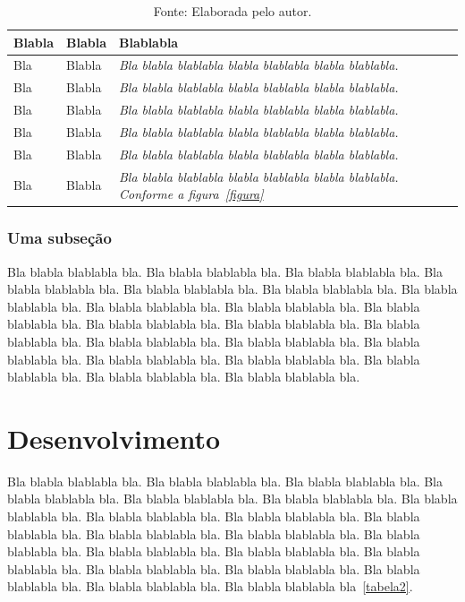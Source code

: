 \documentclass[diss,capa]{texufpel}
\begin{document}
\begin{table}
\caption{Nome da Tabela}\label{tabela}
\centering\begin{tabular}{p{4cm}p{5cm}p{6cm}}
\hline
Blabla & Blabla & Blablabla\\
\hline
{\small Bla} & {\small Blabla} & {\small\em Bla blabla blablabla blabla
  blablabla blabla blablabla.}\\
{\small Bla} & {\small Blabla} & {\small\em Bla blabla blablabla blabla
  blablabla blabla blablabla.}\\
{\small Bla} & {\small Blabla} & {\small\em Bla blabla blablabla blabla
  blablabla blabla blablabla.}\\
{\small Bla} & {\small Blabla} & {\small\em Bla blabla blablabla blabla
  blablabla blabla blablabla.}\\
{\small Bla} & {\small Blabla} & {\small\em Bla blabla blablabla blabla
  blablabla blabla blablabla.}\\
{\small Bla} & {\small Blabla} & {\small\em Bla blabla blablabla blabla
  blablabla blabla blablabla. Conforme a figura~\ref{figura}}\\
\hline
\end{tabular}
\caption*{Fonte: Elaborada pelo autor.}    
\end{table}


\subsection{Uma subseção}

Bla blabla blablabla bla.  Bla blabla blablabla bla.  Bla blabla
blablabla bla.  Bla blabla blablabla bla.  Bla blabla blablabla bla.
Bla blabla blablabla bla.  Bla blabla blablabla bla.  Bla blabla
blablabla bla.  Bla blabla blablabla bla.  Bla blabla blablabla bla.
Bla blabla blablabla bla.  Bla blabla blablabla bla.  Bla blabla
blablabla bla.  Bla blabla blablabla bla.  Bla blabla blablabla bla.
Bla blabla blablabla bla.  Bla blabla blablabla bla.  Bla blabla
blablabla bla.  Bla blabla blablabla bla.  Bla blabla blablabla bla.
Bla blabla blablabla bla.

\chapter{Desenvolvimento}

  Bla blabla blablabla bla.  Bla blabla blablabla bla.  Bla blabla
  blablabla bla.  Bla blabla blablabla bla.  Bla blabla blablabla bla.
  Bla blabla blablabla bla.  Bla blabla blablabla bla.  Bla blabla
  blablabla bla.  Bla blabla blablabla bla.  Bla blabla blablabla bla.
  Bla blabla blablabla bla.  Bla blabla blablabla bla.  Bla blabla
  blablabla bla.  Bla blabla blablabla bla.  Bla blabla blablabla bla.
  Bla blabla blablabla bla.  Bla blabla blablabla bla.  Bla blabla
  blablabla bla.  Bla blabla blablabla bla.  Bla blabla blablabla bla.
  Bla blabla blablabla bla~\ref{tabela2}.
\end{document}
